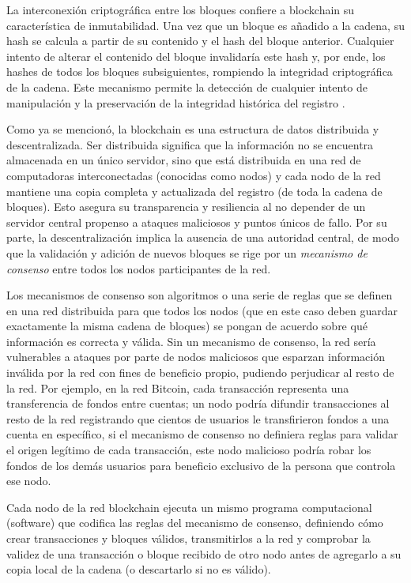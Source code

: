 La interconexión criptográfica entre los bloques confiere a blockchain su característica de inmutabilidad. Una vez que un bloque es añadido a la cadena, su hash se calcula a partir de su contenido y el hash del bloque anterior. Cualquier intento de alterar el contenido del bloque invalidaría este hash y, por ende, los hashes de todos los bloques subsiguientes, rompiendo la integridad criptográfica de la cadena. Este mecanismo permite la detección de cualquier intento de manipulación y la preservación de la integridad histórica del registro \cite{bulkowska2023implementation}. 

Como ya se mencionó, la blockchain es una estructura de datos distribuida y descentralizada. Ser distribuida significa que la información no se encuentra almacenada en un único servidor, sino que está distribuida en una red de computadoras interconectadas (conocidas como nodos) y cada nodo de la red mantiene una copia completa y actualizada del registro (de toda la cadena de bloques). Esto asegura su transparencia y resiliencia al no depender de un servidor central \cite{bulkowska2023implementation} propenso a ataques maliciosos y puntos únicos de fallo. Por su parte, la descentralización implica la ausencia de una autoridad central, de modo que la validación y adición de nuevos bloques se rige por un \textit{mecanismo de consenso} entre todos los nodos participantes de la red. 

Los mecanismos de consenso son algoritmos o una serie de reglas que se definen en una red distribuida para que todos los nodos (que en este caso deben guardar exactamente la misma cadena de bloques) se pongan de acuerdo sobre qué información es correcta y válida. Sin un mecanismo de consenso, la red sería vulnerables a ataques por parte de nodos maliciosos que esparzan información inválida por la red con fines de beneficio propio, pudiendo perjudicar al resto de la red. Por ejemplo, en la red Bitcoin, cada transacción representa una transferencia de fondos entre cuentas; un nodo podría difundir transacciones al resto de la red registrando que cientos de usuarios le transfirieron fondos a una cuenta en específico, si el mecanismo de consenso no definiera reglas para validar el origen legítimo de cada transacción, este nodo malicioso podría robar los fondos de los demás usuarios para beneficio exclusivo de la persona que controla ese nodo.

Cada nodo de la red blockchain ejecuta un mismo programa computacional (software) que codifica las reglas del mecanismo de consenso, definiendo cómo crear transacciones y bloques válidos, transmitirlos a la red y comprobar la validez de una transacción o bloque recibido de otro nodo antes de agregarlo a su copia local de la cadena (o descartarlo si no es válido).

